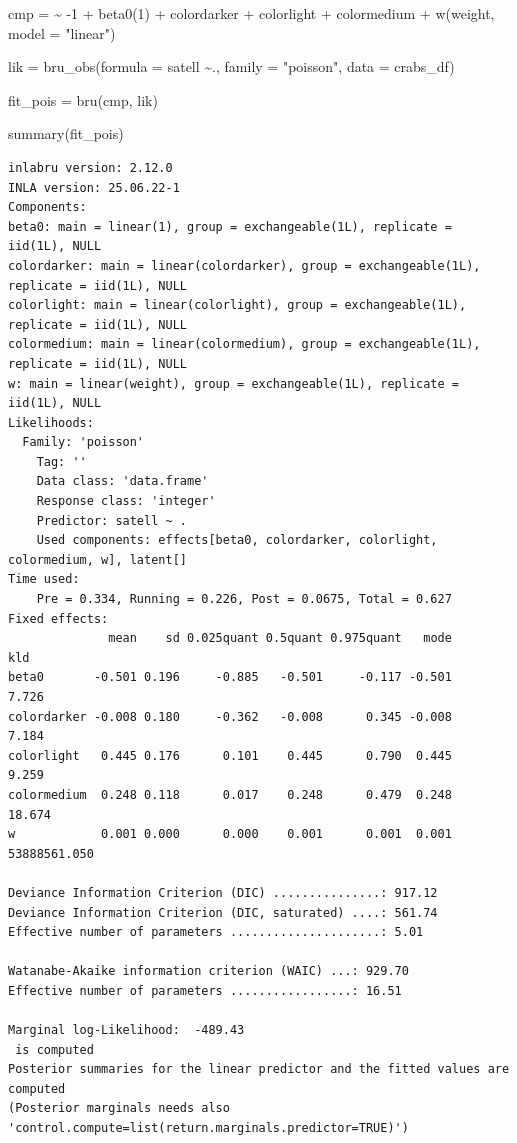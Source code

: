 \documentclass[
  letterpaper,
  DIV=11,
  numbers=noendperiod]{scrartcl}
\newenvironment{Shaded}{\begin{snugshade}}{\end{snugshade}}
\newcommand{\AttributeTok}[1]{\textcolor[rgb]{0.40,0.45,0.13}{#1}}
\newcommand{\DecValTok}[1]{\textcolor[rgb]{0.68,0.00,0.00}{#1}}
\newcommand{\ErrorTok}[1]{\textcolor[rgb]{0.68,0.00,0.00}{#1}}
\newcommand{\FunctionTok}[1]{\textcolor[rgb]{0.28,0.35,0.67}{#1}}
\newcommand{\NormalTok}[1]{\textcolor[rgb]{0.00,0.23,0.31}{#1}}
\newcommand{\OtherTok}[1]{\textcolor[rgb]{0.00,0.23,0.31}{#1}}
\newcommand{\SpecialCharTok}[1]{\textcolor[rgb]{0.37,0.37,0.37}{#1}}
\newcommand{\StringTok}[1]{\textcolor[rgb]{0.13,0.47,0.30}{#1}}
\begin{document}
\begin{Shaded}
\begin{Highlighting}[]
\NormalTok{cmp }\OtherTok{=}  \ErrorTok{\textasciitilde{}} \SpecialCharTok{{-}}\DecValTok{1} \SpecialCharTok{+} \FunctionTok{beta0}\NormalTok{(}\DecValTok{1}\NormalTok{) }\SpecialCharTok{+}\NormalTok{  colordarker }\SpecialCharTok{+}
\NormalTok{       colorlight }\SpecialCharTok{+}\NormalTok{ colormedium }\SpecialCharTok{+}
       \FunctionTok{w}\NormalTok{(weight, }\AttributeTok{model =} \StringTok{"linear"}\NormalTok{)}

\NormalTok{lik }\OtherTok{=}  \FunctionTok{bru\_obs}\NormalTok{(}\AttributeTok{formula =}\NormalTok{ satell }\SpecialCharTok{\textasciitilde{}}\NormalTok{.,}
            \AttributeTok{family =} \StringTok{"poisson"}\NormalTok{,}
            \AttributeTok{data =}\NormalTok{ crabs\_df)}

\NormalTok{fit\_pois }\OtherTok{=} \FunctionTok{bru}\NormalTok{(cmp, lik)}

\FunctionTok{summary}\NormalTok{(fit\_pois)}
\end{Highlighting}
\end{Shaded}

\begin{verbatim}
inlabru version: 2.12.0
INLA version: 25.06.22-1
Components:
beta0: main = linear(1), group = exchangeable(1L), replicate = iid(1L), NULL
colordarker: main = linear(colordarker), group = exchangeable(1L), replicate = iid(1L), NULL
colorlight: main = linear(colorlight), group = exchangeable(1L), replicate = iid(1L), NULL
colormedium: main = linear(colormedium), group = exchangeable(1L), replicate = iid(1L), NULL
w: main = linear(weight), group = exchangeable(1L), replicate = iid(1L), NULL
Likelihoods:
  Family: 'poisson'
    Tag: ''
    Data class: 'data.frame'
    Response class: 'integer'
    Predictor: satell ~ .
    Used components: effects[beta0, colordarker, colorlight, colormedium, w], latent[]
Time used:
    Pre = 0.334, Running = 0.226, Post = 0.0675, Total = 0.627 
Fixed effects:
              mean    sd 0.025quant 0.5quant 0.975quant   mode          kld
beta0       -0.501 0.196     -0.885   -0.501     -0.117 -0.501        7.726
colordarker -0.008 0.180     -0.362   -0.008      0.345 -0.008        7.184
colorlight   0.445 0.176      0.101    0.445      0.790  0.445        9.259
colormedium  0.248 0.118      0.017    0.248      0.479  0.248       18.674
w            0.001 0.000      0.000    0.001      0.001  0.001 53888561.050

Deviance Information Criterion (DIC) ...............: 917.12
Deviance Information Criterion (DIC, saturated) ....: 561.74
Effective number of parameters .....................: 5.01

Watanabe-Akaike information criterion (WAIC) ...: 929.70
Effective number of parameters .................: 16.51

Marginal log-Likelihood:  -489.43 
 is computed 
Posterior summaries for the linear predictor and the fitted values are computed
(Posterior marginals needs also 'control.compute=list(return.marginals.predictor=TRUE)')
\end{verbatim}
\end{document}
